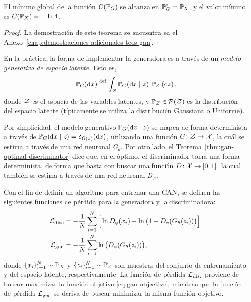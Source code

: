 \begin{theorem}\label{thm:gan-optimal-generator}
	El mínimo global de la función $C(\Prob_G)$ se alcanza en $\Prob_G^\ast = \Prob_X$, y el valor mínimo es $C(\Prob_X) = - \ln 4$.
\end{theorem}

\begin{proof}
	La demostración de este teorema se encuentra en el Anexo~\ref{chap:demostraciones-adicionales-teos-gan}.
\end{proof}

En la práctica, la forma de implementar la generadora es a través de un \emph{modelo generativo de espacio latente}. Esto es,
\begin{equation}\label{eq:generative-model}
	\Prob_G (\dd x) \eqdef \int_\cZ \Prob_G(\dd x \mid z) \; \Prob_Z \left( \dd z\right),
\end{equation}
donde $\mathcal{Z}$ es el espacio de las variables latentes, y $\Prob_Z \in \ProbSpace[\cZ] $ es la distribución del espacio latente (típicamente se utiliza la distribución Gaussiana o Uniforme).

Por simplicidad, el modelo generativo $\Prob_G (\dd x \mid z)$ se mapea de forma determinista a través de $\Prob_G (\dd x \mid z) = \delta_{G(z)}(\dd x)$, utilizando una función $G\colon \mathcal{Z} \to \mathcal{X}$, la cuál se estima a través de una red neuronal $G_\theta$. Por otro lado, el Teorema~\ref{thm:gan-optimal-discriminator} dice que, en el óptimo, el discriminador toma una forma determinista, de forma que basta con buscar una función $D\colon\mathcal{X}\to [0, 1]$, la cual también se estima a través de una red neuronal $D_\varphi$.


Con el fin de definir un algoritmo para entrenar una GAN, se definen las siguientes funciones de pérdida para la generadora y la discriminadora:
\begin{align}
	\cL_{\mathrm{disc}} & = -\frac{1}{N}\sum_{i=1}^{N} \Big[ \ln D_\varphi(x_i) + \ln \qty\big(1 - D_\varphi(G_\theta(z_i))) \Big], \\
	\cL_{\mathrm{gen}}  & = - \frac{1}{N}\sum_{i=1}^{N} \ln \qty\big(D_\varphi(G_\theta(z_i))),
\end{align}
donde $\{x_i\}_{i=1}^{N} \sim \Prob_X$ y $\{z_i\}_{i=1}^{N} \sim \Prob_Z$ son muestras del conjunto de entrenamiento y del espacio latente, respectivamente. La función de pérdida $\mathcal{L}_{\mathrm{disc}}$ proviene de buscar maximizar la función objetivo \eqref{eq:gan-objective}, mientras que la función de pérdida $\mathcal{L}_{\mathrm{gen}}$ se deriva de buscar minimizar la misma función objetivo.

